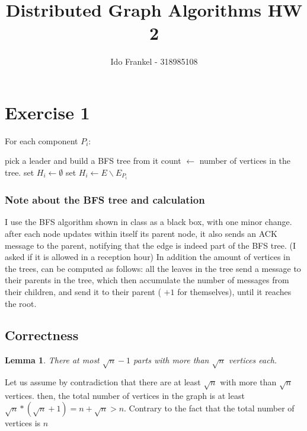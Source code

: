 \documentclass[11pt]{article}
\newtheorem{lemma}[theorem]{Lemma}
\begin{document}
\author{Ido Frankel - 318985108}
\title{Distributed Graph Algorithms HW 2}
\maketitle

\medskip


\section{Exercise 1}
For each component $P_i$:
\begin{algorithmic}[1]
\State pick a leader and build a BFS tree from it
\State count $\leftarrow$ number of vertices in the tree.
    \State set $H_i \leftarrow \emptyset$
\Else
    \State set $H_i \leftarrow E \backslash E_{P_{i}}$
\EndIf
\end{algorithmic}

\subsubsection*{Note about the BFS tree and calculation}
I use the BFS algorithm shown in class as a black box, with one minor change. after each node updates within itself its parent node, it also sends an ACK message to the parent, notifying that the edge is indeed part of the BFS tree. (I asked if it is allowed in a reception hour)
In addition the amount of vertices in the trees, can be computed as follows: all the leaves in the tree send a message to their parents in the tree, which then accumulate the number of messages from their children, and send it to their parent ( $+1$ for themselves), until it reaches the root.

\subsection*{Correctness}

\begin{lemma}
\label{parts_bound_amount}
There at most $\sqrt{n} -1 $ parts with more than $\sqrt{n}$ vertices each.
\end{lemma}
Let us assume by contradiction that there are at least $\sqrt{n}$ with more than $\sqrt{n}$ vertices. then, the total number of vertices in the graph is at least $\sqrt{n} * (\sqrt{n} +1 )= n + \sqrt{n} > n$. Contrary to the fact that the total number of vertices is $n$
\end{document}
